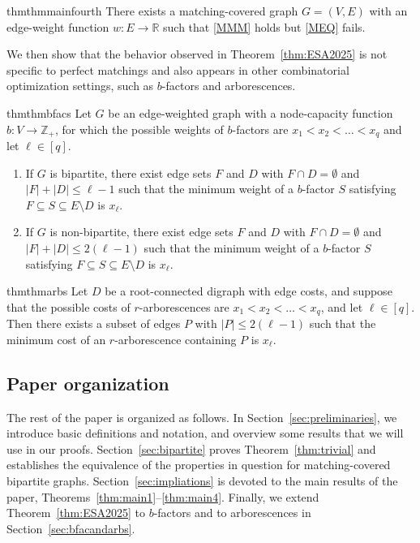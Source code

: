 \documentclass{article}
\theoremstyle{plain}
\theoremstyle{definition}
\begin{document}
\begin{restatable}{thm}{thmmainfourth}
\label{thm:main4}
    There exists a matching-covered graph $G=(V,E)$ with an edge-weight function $w\colon E \to \mathbb{R}$ such that \ref{MMM} holds but \ref{MEQ} fails.
\end{restatable}

We then show that the behavior observed in Theorem~\ref{thm:ESA2025} is not specific to perfect matchings and also appears in other combinatorial optimization settings, such as $b$-factors and arborescences.

\begin{restatable}{thm}{thmbfacs}
\label{thm:b-factor}
    Let $G$ be an edge-weighted graph with a node-capacity function $b\colon V \to \mathbb{Z}_+$, for which the possible weights of $b$-factors are $x_{1} < x_{2} < \dots < x_{q}$ and let $\ell\in[q]$.
    \begin{enumerate}[label=(\roman*)]\itemsep0em
        \item If $G$ is bipartite, there exist edge sets $F$ and $D$ with $F\cap D = \emptyset$ and $|F| + |D| \leq \ell -1$ such that the minimum weight of a $b$-factor $S$ satisfying $F\subseteq S \subseteq E\setminus D$ is $x_\ell$.
        \item If $G$ is non-bipartite, there exist edge sets $F$ and $D$ with $F\cap D = \emptyset$ and $|F| + |D| \leq 2(\ell -1)$ such that the minimum weight of a $b$-factor $S$ satisfying $F\subseteq S \subseteq E\setminus D$ is $x_\ell$.
    \end{enumerate}
\end{restatable}

\begin{restatable}{thm}{thmarbs}
\label{thm:arbs}
    Let $D$ be a root-connected digraph with edge costs, and suppose that the possible costs of $r$-arborescences are
    $x_1 < x_2 < \dots < x_q$, and let $\ell \in [q]$. Then there exists a subset of edges $P$ with $|P| \le 2(\ell - 1)$ such that the minimum cost of an $r$-arborescence containing $P$ is $x_\ell$.
\end{restatable}

\subsection{Paper organization}
\label{sec:organization}

The rest of the paper is organized as follows. In Section~\ref{sec:preliminaries}, we introduce basic definitions and notation, and overview some results that we will use in our proofs. Section~\ref{sec:bipartite} proves Theorem~\ref{thm:trivial} and establishes the equivalence of the properties in question for matching-covered bipartite graphs. Section~\ref{sec:impliations} is devoted to the main results of the paper, Theorems~\ref{thm:main1}--\ref{thm:main4}. Finally, we extend Theorem~\ref{thm:ESA2025} to $b$-factors and to arborescences in Section~\ref{sec:bfacandarbs}. 
\end{document}
